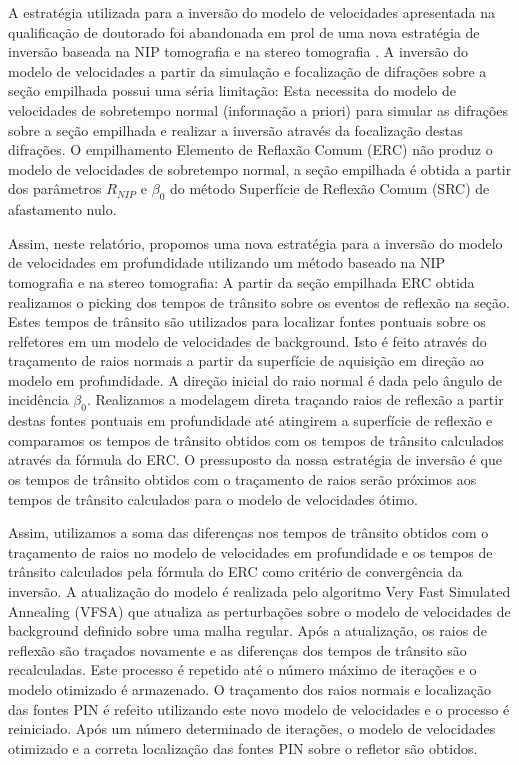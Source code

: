 A estratégia utilizada para a inversão do modelo de velocidades apresentada na
qualificação de doutorado foi abandonada em prol de uma nova estratégia de
inversão baseada na NIP tomografia e na stereo tomografia \cite{niptomo,stereo}.
A inversão do modelo de velocidades a partir da simulação e focalização
de difrações sobre a seção empilhada  
possui uma séria limitação: Esta necessita do modelo de velocidades
de sobretempo normal (informação a priori) para simular as difrações sobre a seção empilhada e realizar a inversão através da focalização destas difrações. O empilhamento Elemento de Reflaxão Comum (ERC)
não produz o modelo de velocidades de sobretempo normal,
a seção empilhada é obtida a partir dos parâmetros $R_{NIP}$ e $\beta_0$ do método 
Superfície de Reflexão Comum (SRC) de afastamento nulo.

Assim, neste relatório, propomos uma nova estratégia para a inversão do modelo de velocidades em
profundidade utilizando um método baseado na NIP tomografia e na stereo tomografia: A partir da seção
empilhada ERC obtida realizamos o picking dos tempos de trânsito sobre os eventos de
reflexão na seção. Estes tempos de trânsito são utilizados para localizar fontes pontuais sobre os relfetores
em um modelo de velocidades de background. Isto é feito através do traçamento de raios normais a partir
da superfície de aquisição em direção ao modelo em profundidade. A direção inicial do raio normal
é dada pelo ângulo de incidência $\beta_0$.
Realizamos a modelagem direta traçando raios de reflexão a partir destas fontes pontuais em profundidade
até atingirem a superfície de reflexão e comparamos os tempos de trânsito obtidos com os tempos de trânsito
calculados através da fórmula do ERC. O pressuposto da nossa estratégia de inversão é que os tempos
de trânsito obtidos com o traçamento de raios serão próximos aos tempos de trânsito calculados para
o modelo de velocidades ótimo.

Assim, utilizamos a soma das diferenças nos tempos de trânsito obtidos com o traçamento de raios
no modelo de velocidades em profundidade e os tempos de trânsito calculados pela fórmula do ERC como
critério de convergência da inversão. A atualização do modelo é realizada pelo algoritmo
Very Fast Simulated Annealing (VFSA) que atualiza as perturbações sobre o modelo de velocidades
de background definido sobre uma malha regular. Após a atualização, os raios de reflexão são
traçados novamente e as diferenças dos tempos de trânsito são recalculadas. Este processo é
repetido até o número máximo de iterações e o modelo otimizado é armazenado. O traçamento
dos raios normais e localização das fontes PIN é refeito utilizando este novo modelo de velocidades
e o processo é reiniciado. Após um número determinado de iterações, o modelo de velocidades otimizado 
e a correta localização das fontes PIN sobre o refletor são obtidos.



